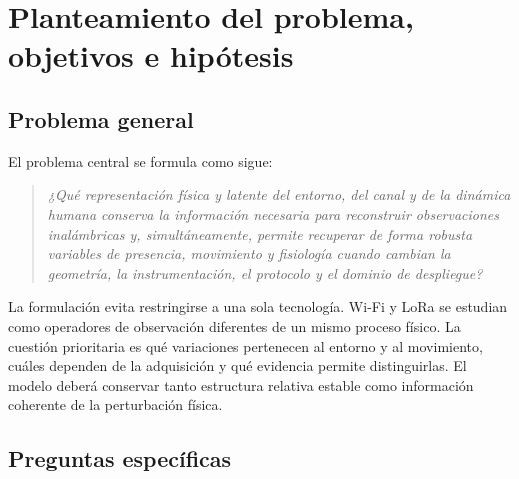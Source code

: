 \chapter{Planteamiento del problema, objetivos e hipótesis}
\label{ch:problem}

\section{Problema general}

El problema central se formula como sigue:
\begin{quote}
\emph{¿Qué representación física y latente del entorno, del canal y de la dinámica humana conserva la información necesaria para reconstruir observaciones inalámbricas y, simultáneamente, permite recuperar de forma robusta variables de presencia, movimiento y fisiología cuando cambian la geometría, la instrumentación, el protocolo y el dominio de despliegue?}
\end{quote}

La formulación evita restringirse a una sola tecnología. Wi-Fi y LoRa se estudian como operadores de observación diferentes de un mismo proceso físico. La cuestión prioritaria es qué variaciones pertenecen al entorno y al movimiento, cuáles dependen de la adquisición y qué evidencia permite distinguirlas. El modelo deberá conservar tanto estructura relativa estable como información coherente de la perturbación física.

\section{Preguntas específicas}

